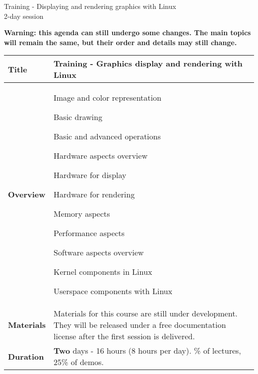 \documentclass[a4paper,12pt,obeyspaces,spaces,hyphens]{article}
\begin{document}
\thispagestyle{fancy}

\setlength{\arrayrulewidth}{0.8pt}

\begin{center}
\LARGE
Training - Displaying and rendering graphics with Linux\\
\large
2-day session
\end{center}

\vspace{1cm}
{\bf Warning: this agenda can still undergo some changes.
The main topics will remain the same, but their order
and details may still change.}

\vspace{1cm}
\small
{}

 {
  \begin{tabularx}{\textwidth}{|g|h|}
    {\bf Title} & {\bf Training - Graphics display and rendering with Linux} \\
    \hline

    {\bf Overview} &
    Image and color representation \par
    Basic drawing \par
    Basic and advanced operations \par
    Hardware aspects overview \par
    Hardware for display \par
    Hardware for rendering \par
    Memory aspects \par
    Performance aspects \par
    Software aspects overview \par
    Kernel components in Linux \par
    Userspace components with Linux\\
    \hline
    {\bf Materials} &
     Materials for this course are still under development.
     They will be released under a free documentation license
     after the first session is delivered.\\
    \hline

    {\bf Duration} & {\bf Two} days - 16 hours (8 hours per day).
    \% of lectures, 25\% of demos. \\
    \hline


\end{tabularx}}
\end{document}
